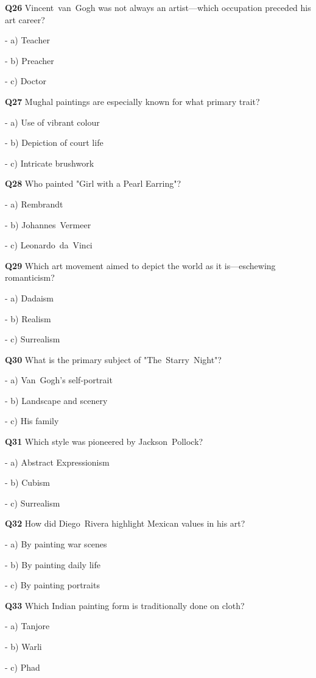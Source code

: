 \textbf{Q26} Vincent van Gogh was not always an artist—which occupation preceded his art career?\par
\quad - a) Teacher\par
\quad - b) Preacher\par
\quad - c) Doctor\par

\textbf{Q27} Mughal paintings are especially known for what primary trait?\par
\quad - a) Use of vibrant colour\par
\quad - b) Depiction of court life\par
\quad - c) Intricate brushwork\par

\textbf{Q28} Who painted "Girl with a Pearl Earring"?\par
\quad - a) Rembrandt\par
\quad - b) Johannes Vermeer\par
\quad - c) Leonardo da Vinci\par

\textbf{Q29} Which art movement aimed to depict the world as it is—eschewing romanticism?\par
\quad - a) Dadaism\par
\quad - b) Realism\par
\quad - c) Surrealism\par

\textbf{Q30} What is the primary subject of "The Starry Night"?\par
\quad - a) Van Gogh's self‑portrait\par
\quad - b) Landscape and scenery\par
\quad - c) His family\par

\textbf{Q31} Which style was pioneered by Jackson Pollock?\par
\quad - a) Abstract Expressionism\par
\quad - b) Cubism\par
\quad - c) Surrealism\par

\textbf{Q32} How did Diego Rivera highlight Mexican values in his art?\par
\quad - a) By painting war scenes\par
\quad - b) By painting daily life\par
\quad - c) By painting portraits\par

\textbf{Q33} Which Indian painting form is traditionally done on cloth?\par
\quad - a) Tanjore\par
\quad - b) Warli\par
\quad - c) Phad\par


